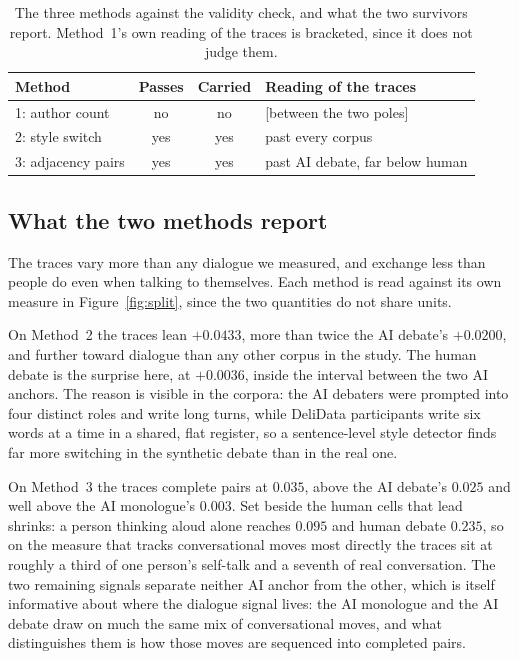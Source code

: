 \documentclass[10pt,twocolumn]{article}
\begin{document}
\begin{table}[t]
\centering
\small
\setlength{\tabcolsep}{4pt}
\caption{The three methods against the validity check, and what the two survivors report.
Method~1's own reading of the traces is bracketed, since it does not judge them.}
\label{tab:verdict}
\begin{tabular}{@{}lccl@{}}
\toprule
Method & Passes & Carried & Reading of the traces \\
\midrule
1: author count & no & no & [between the two poles] \\
2: style switch & yes & yes & past every corpus \\
3: adjacency pairs & yes & yes & past AI debate, far below human \\
\bottomrule
\end{tabular}
\end{table}

\subsection{What the two methods report}
The traces vary more than any dialogue we measured, and exchange less than people do even when
talking to themselves. Each method is read against its own measure in Figure~\ref{fig:split}, since
the two quantities do not share units.

On Method~2 the traces lean $+0.0433$, more than twice the AI debate's $+0.0200$, and further toward
dialogue than any other corpus in the study. The human debate is the surprise here, at $+0.0036$,
inside the interval between the two AI anchors. The reason is visible in the corpora: the AI debaters
were prompted into four distinct roles and write long turns, while DeliData participants write six
words at a time in a shared, flat register, so a sentence-level style detector finds far more
switching in the synthetic debate than in the real one.

On Method~3 the traces complete pairs at $0.035$, above the AI debate's $0.025$ and well above the AI
monologue's $0.003$. Set beside the human cells that lead shrinks: a person thinking aloud alone
reaches $0.095$ and human debate $0.235$, so on the measure that tracks conversational moves most
directly the traces sit at roughly a third of one person's self-talk and a seventh of real
conversation. The two remaining signals separate neither AI anchor from the other, which is itself
informative about where the dialogue signal lives: the AI monologue and the AI debate draw on much the
same mix of conversational moves, and what distinguishes them is how those moves are sequenced into
completed pairs.
\end{document}
